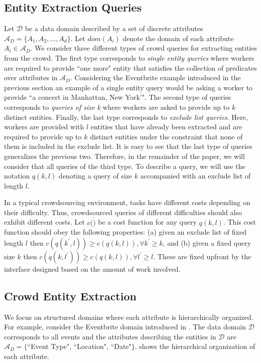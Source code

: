 \documentclass{vldb}
\newcommand{\domain}{\mathcal{D}}
\newcommand{\attributes}{\mathcal{A}_D}
\begin{document}
\subsection{Entity Extraction Queries}
\label{sec:queries}
Let $\domain$ be a data domain described by a set of discrete attributes $\attributes = \{A_1, A_2, \dots, A_d\}$. Let $dom(A_i)$ denote the domain of each attribute $A_i  \in \attributes$.  We consider three different types of crowd queries for extracting entities from the crowd. The first type corresponds to {\em single entity queries} where workers are required to provide ``one more" entity that satisfies the collection of predicates over attributes in $\attributes$. Considering the Eventbrite example introduced in the previous section an example of a single entity query would be asking a worker to provide ``a concert in Manhattan, New York'". The second type of queries corresponds to {\em queries of  size k} where workers are asked to provide up to $k$ distinct entities. Finally, the last type corresponds to {\em exclude list queries}. Here,  workers are provided with $l$ entities that have already been extracted and are required to provide up to $k$ distinct entities under the constraint that none of them is included in the exclude list. It is easy to see that the last type of queries generalizes the previous two. Therefore, in the remainder of the paper, we will consider that all queries of the third type. To describe a query, we will use the notation $q(k,l)$ denoting a query of size $k$ accompanied with an exclude list of length $l$. 

In a typical crowdsourcing environment, tasks have different costs depending on their difficulty. Thus, crowdsourced queries of different difficulties should also exhibit different costs. Let $c(\dot)$ be a cost function for any query $q(k,l)$. This cost function should obey the following properties: (a) given an exclude list of fixed length $l$ then $c(q(k^{\prime},l)) \geq c(q(k,l)),  \forall k^{\prime} \geq k$, and (b) given a fixed query size $k$ then $c(q(k,l^{\prime})) \geq c(q(k,l)), \forall l^{\prime} \geq l$. These are fixed upfront by the interface designed based on the amount of work involved.

\subsection{Crowd Entity Extraction}
\label{sec:extraction}
We focus on structured domains where each attribute is hierarchically organized. For example, consider the Eventbrite domain introduced in . The data domain $\domain$ corresponds to all events and the attributes describing the entities in $\domain$ are $\attributes = \{$``Event Type", ``Location", ``Date"$\}$.  shows the hierarchical organization of each attribute.
\end{document}

